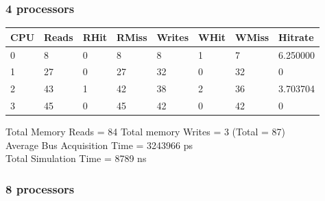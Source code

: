 \documentclass[]{article}
\begin{document}
\subsubsection{4 processors}

\begin{table}[H]
	\begin{tabular}{|l|l|l|l|l|l|l|l|}
		\hline
		\textbf{CPU} & \textbf{Reads} & \textbf{RHit} & \textbf{RMiss} & \textbf{Writes} & \textbf{WHit} & \textbf{WMiss} & \textbf{Hitrate} \\ \hline
		0            & 8              & 0             & 8              & 8               & 1             & 7              & 6.250000         \\ \hline
		1            & 27             & 0             & 27             & 32              & 0             & 32             & 0                \\ \hline
		2            & 43             & 1             & 42             & 38              & 2             & 36             & 3.703704         \\ \hline
		3            & 45             & 0             & 45             & 42              & 0             & 42             & 0                \\ \hline
	\end{tabular}
\end{table}

Total Memory Reads = 84 Total memory Writes = 3 (Total = 87)\\
Average Bus Acquisition Time = 3243966 ps\\
Total Simulation Time = 8789 ns

\subsubsection{8 processors}
\end{document}
